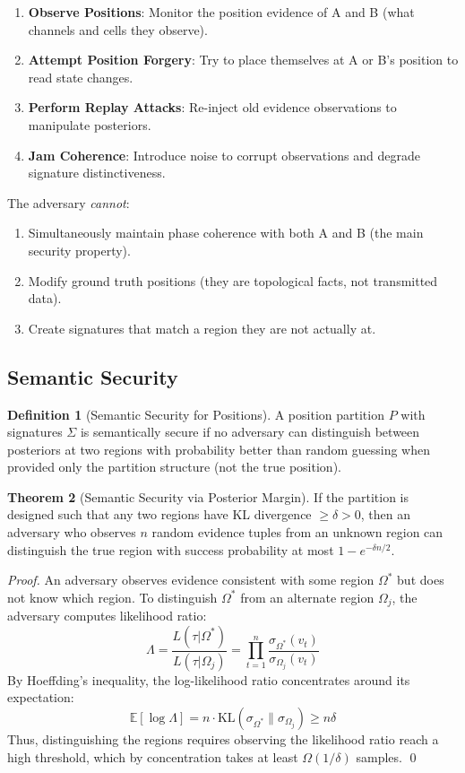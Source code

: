 \documentclass[11pt,a4paper]{article}
\theoremstyle{definition}
\newtheorem{definition}{Definition}[section]
\newtheorem{theorem}[definition]{Theorem}
\begin{document}
\begin{enumerate}
\item \textbf{Observe Positions}: Monitor the position evidence of A and B (what channels and cells they observe).
\item \textbf{Attempt Position Forgery}: Try to place themselves at A or B's position to read state changes.
\item \textbf{Perform Replay Attacks}: Re-inject old evidence observations to manipulate posteriors.
\item \textbf{Jam Coherence}: Introduce noise to corrupt observations and degrade signature distinctiveness.
\end{enumerate}

The adversary \textit{cannot}:
\begin{enumerate}
\item Simultaneously maintain phase coherence with both A and B (the main security property).
\item Modify ground truth positions (they are topological facts, not transmitted data).
\item Create signatures that match a region they are not actually at.
\end{enumerate}

\subsection{Semantic Security}

\begin{definition}[Semantic Security for Positions]
A position partition $P$ with signatures $\Sigma$ is semantically secure if no adversary can distinguish between posteriors at two regions with probability better than random guessing when provided only the partition structure (not the true position).
\end{definition}

\begin{theorem}[Semantic Security via Posterior Margin]
If the partition is designed such that any two regions have KL divergence $\geq \delta > 0$, then an adversary who observes $n$ random evidence tuples from an unknown region can distinguish the true region with success probability at most $1 - e^{-\delta n/2}$.
\end{theorem}

\begin{proof}
An adversary observes evidence consistent with some region $\Omega^*$ but does not know which region. To distinguish $\Omega^*$ from an alternate region $\Omega_j$, the adversary computes likelihood ratio:
\[
\Lambda = \frac{L(\tau | \Omega^*)}{L(\tau | \Omega_j)} = \prod_{t=1}^n \frac{\sigma_{\Omega^*}(v_t)}{\sigma_{\Omega_j}(v_t)}
\]
By Hoeffding's inequality, the log-likelihood ratio concentrates around its expectation:
\[
\mathbb{E}[\log \Lambda] = n \cdot \mathrm{KL}(\sigma_{\Omega^*} \| \sigma_{\Omega_j}) \geq n \delta
\]
Thus, distinguishing the regions requires observing the likelihood ratio reach a high threshold, which by concentration takes at least $\Omega(1/\delta)$ samples. \qed
\end{proof}
\end{document}

